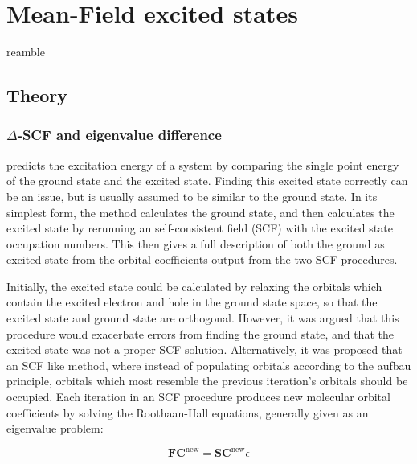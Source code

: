 %
%
\let\textcircled=\pgftextcircled
\chapter{Mean-Field excited states}
\label{chap:dscf}

reamble

\section{Theory}
\label{sec:dscf_theory}

\subsection{$\Delta$-SCF and eigenvalue difference}
\label{subsec{dscf_and_eigdiff}}

\dscf predicts the excitation energy of a system by comparing the single point
energy of the ground state and the excited state. Finding this excited state
correctly can be an issue, but is usually assumed to be similar to the ground
state. In its simplest form, the \dscf method calculates the ground state, and
then calculates the excited state by rerunning an self-consistent field (SCF) 
with the excited state occupation numbers. This then gives a full description 
of both the ground as excited state from the orbital coefficients output from 
the two SCF procedures.

Initially, the excited state could be calculated by relaxing the orbitals which
contain the excited electron and hole in the ground state space, so that the
excited state and ground state are orthogonal\cite{Hunt1969}. However, it was
argued that this procedure would exacerbate errors from finding the ground
state, and that the excited state was not a proper SCF solution\cite{Gilbert2008}.
Alternatively, it was proposed that an SCF like method, where instead of
populating orbitals according to the aufbau principle, orbitals which most
resemble the previous iteration's orbitals should be occupied. Each iteration 
in an SCF procedure produces new molecular orbital coefficients by solving the 
Roothaan-Hall equations\cite{Roothaan1951}, generally given as an eigenvalue problem:

\begin{equation}
\mathbf{F} \mathbf{C}^{\text{new}} = \mathbf{S} \mathbf{C}^{\text{new}} \epsilon
\end{equation}

